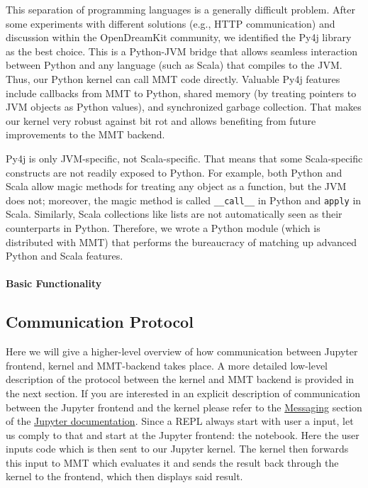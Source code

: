This separation of programming languages is a generally difficult problem.
After some experiments with different solutions (e.g., HTTP communication) and discussion within the OpenDreamKit community, we identified the Py4j library~\cite{Py4j} as the best choice.
This is a Python-JVM bridge that allows seamless interaction between Python and any language (such as Scala) that compiles to the JVM.
Thus, our Python kernel can call MMT code directly.
Valuable Py4j features include callbacks from MMT to Python, shared memory (by treating pointers to JVM objects as Python values), and synchronized garbage collection.
That makes our kernel very robust against bit rot and allows benefiting from future improvements to the MMT backend.

Py4j is only JVM-specific, not Scala-specific.
That means that some Scala-specific constructs are not readily exposed to Python.
For example, both Python and Scala allow magic methods for treating any object as a function, but the JVM does not; moreover, the magic method is called \texttt{\_\_call\_\_} in Python and \texttt{apply} in Scala.
Similarly, Scala collections like lists are not automatically seen as their counterparts in Python.
Therefore, we wrote a Python module (which is distributed with MMT) that performs the bureaucracy of matching up advanced Python and Scala features.

\paragraph{Basic Functionality}


\subsection{Communication Protocol}

Here we will give a higher-level overview of how communication between Jupyter frontend, kernel and MMT-backend takes place.
A more detailed low-level description of the protocol between the kernel and MMT backend is provided in the next section. If you are interested in an explicit description of communication between the Jupyter frontend and the kernel please refer to the \hyperlink{https://jupyter-client.readthedocs.io/en/latest/messaging.html}{Messaging} section of the \hyperlink{http://jupyter.org/documentation}{Jupyter documentation}.
Since a REPL always start with user a input, let us comply to that and start at the Jupyter frontend: the notebook.
Here the user inputs code which is then sent to our Jupyter kernel.
The kernel then forwards this input to MMT which evaluates it and sends the result back through the kernel to the frontend, which then displays said result.

